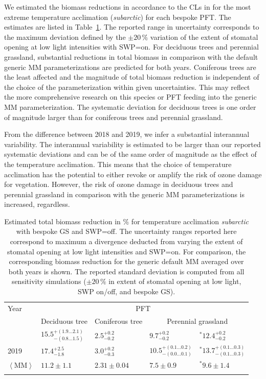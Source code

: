 \documentclass[bg, manuscript]{copernicus}
\begin{document}
We estimated the biomass reductions in accordance to the CLs in \citet{ICP:MappingManual2017, ESPR:Hayes2021} for the most extreme temperature acclimation (\emph{subarctic}) for each bespoke PFT. The estimates are listed in Table~\ref{tab:biomass_reduction}. The reported range in uncertainty corresponds to the maximum deviation defined by the $\pm 20\,\unit{\%}$ variation of the extent of stomatal opening at low light intensities with SWP=on. For deciduous trees and perennial grassland, substantial reductions in total biomass in comparison with the default generic MM parameterizations are predicted for both years. Coniferous trees are the least affected and the magnitude of total biomass reduction is independent of the choice of the parameterization within given uncertainties. This may reflect the more comprehensive research on this species or PFT feeding into the generic MM parameterization. The systematic deviation for deciduous trees is one order of magnitude larger than for coniferous trees and perennial grassland.

From the difference between 2018 and 2019, we infer a substantial interannual variability. The interannual variability is estimated to be larger than our reported systematic deviations and can be of the same order of magnitude as the effect of the temperature acclimation. This means that the choice of temperature acclimation has the potential to either revoke or amplify the risk of ozone damage for vegetation. However, the risk of ozone damage in deciduous trees and perennial grassland in comparison with the generic MM parameterizations is increased, regardless.

\begin{table}[t]
  \caption{Estimated total biomass reduction in \unit{\%} for temperature acclimation \emph{subarctic} with bespoke GS and SWP=off. The uncertainty ranges reported here correspond to maximum a divergence deducted from varying the extent of stomatal opening at low light intensities and SWP=on. For comparison, the corresponding biomass reduction for the generic default MM averaged over both years is shown. The reported standard deviation is computed from all sensitivity simulations ($\pm 20\,\unit{\%}$ in extent of stomatal opening at low light, SWP on/off, and bespoke GS).}
  \label{tab:biomass_reduction}
\begin{tabular}{lllll}
\tophline
Year & \multicolumn{4}{c}{PFT}\\
& Deciduous tree& Coniferous tree & \multicolumn{2}{c}{Perennial grassland}\\
\middlehline
2018 & $15.5^{+(1.9...2.1)}_{-(0.8...1.5)}$ & $2.5^{+0.2}_{-0.2}$ & $9.7^{+0.2}_{-0.2}$ & $^*12.4^{+0.2}_{-0.2}$\\
2019 & $17.4^{+2.5}_{-1.8}$ & $3.0^{+0.2}_{-0.3}$ & $10.5^{+(0.1...0.2)}_{-(0.0...0.1)}$ & $^*13.7^{+(0.1...0.3)}_{-(0.1...0.3)}$\\
\middlehline
$\left<\mathrm{MM}\right>$ & $11.2\pm 1.1$ & $2.31\pm 0.04$ & $7.5\pm 0.9$ & $^*9.6\pm 1.4$\\
\bottomhline
\end{tabular}
\end{table}
\end{document}
